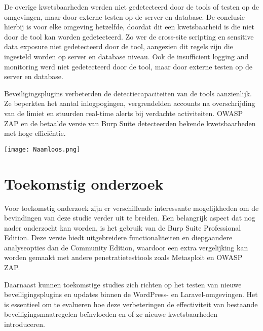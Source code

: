 \documentclass[a0,portrait]{hogent-poster}
\begin{document}
\begin{multicols}{2}
De overige kwetsbaarheden werden niet gedetecteerd door de tools of testen op de omgevingen, maar door externe testen op de 
server en database. De conclusie hierbij is voor elke omgeving hetzelfde, doordat dit een kwetsbaarheid is die niet door de tool 
kan worden gedetecteerd. Zo wer de cross-site scripting en sensitive data exposure niet gedetecteerd door de tool, aangezien dit regels zijn 
die ingesteld worden op server en database niveau. Ook de insufficient logging and monitoring werd niet gedetecteerd door de tool, 
maar door externe testen op de server en database.

Beveiligingsplugins verbeterden de detectiecapaciteiten van de tools aanzienlijk. Ze beperkten het aantal inlogpogingen, 
vergrendelden accounts na overschrijding van de limiet en stuurden real-time alerts bij verdachte activiteiten. OWASP ZAP 
en de betaalde versie van Burp Suite detecteerden bekende kwetsbaarheden met hoge efficiëntie.
\begin{center}
  \captionsetup{type=figure}
  \texttt{[image: Naamloos.png]}
\end{center}
\section{Toekomstig onderzoek}

Voor toekomstig onderzoek zijn er verschillende interessante mogelijkheden om de bevindingen van deze studie verder uit te 
breiden. Een belangrijk aspect dat nog nader onderzocht kan worden, is het gebruik van de Burp Suite Professional Edition. 
Deze versie biedt uitgebreidere functionaliteiten en diepgaandere analyseopties dan de Community Edition, waardoor een extra 
vergelijking kan worden gemaakt met andere penetratietesttools zoals Metasploit en OWASP ZAP.

Daarnaast kunnen toekomstige studies zich richten op het testen van nieuwe beveiligingsplugins en updates binnen de 
WordPress- en Laravel-omgevingen. Het is essentieel om te evalueren hoe deze verbeteringen de effectiviteit van bestaande 
beveiligingsmaatregelen beïnvloeden en of ze nieuwe kwetsbaarheden introduceren.
\end{multicols}
\end{document}
